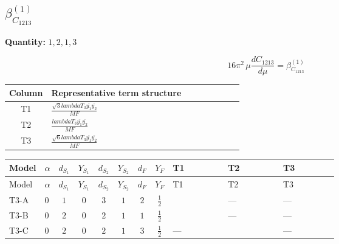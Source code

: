 \documentclass[8pt]{article}
\begin{document}
\begin{landscape}
\section*{$\beta_{C_{1213}}^{(1)}$}
\noindent\textbf{Quantity: }$\mathrm{1,2,1,3}$\par\smallskip
\[16\pi^2\,\mu\frac{d C_{1213}}{d\mu}=\beta_{C_{1213}}^{(1)}\]
\begin{center}
\begin{tabular}{@{}c >{\raggedright\arraybackslash}p{0.82\linewidth}@{}}
\toprule
Column & Representative term structure \\
\midrule
T1 & \(\displaystyle \frac{\sqrt{3} lambdaT_{3} \overline{y_{1}} \overline{y_{2}}}{MF}\) \\
\midrule
T2 & \(\displaystyle \frac{lambdaT_{3} \overline{y_{1}} \overline{y_{2}}}{MF}\) \\
\midrule
T3 & \(\displaystyle \frac{\sqrt{6} lambdaT_{3} \overline{y_{1}} \overline{y_{2}}}{MF}\) \\
\midrule
\bottomrule
\end{tabular}
\end{center}
\smallskip
\tiny
\begin{longtable}{@{}llcccccc >{\raggedright\arraybackslash}p{0.21\linewidth} >{\raggedright\arraybackslash}p{0.21\linewidth} >{\raggedright\arraybackslash}p{0.21\linewidth}@{}}
\toprule
Model & $\alpha$ & $d_{S_1}$ & $Y_{S_1}$ & $d_{S_2}$ & $Y_{S_2}$ & $d_F$ & $Y_F$ & T1 & T2 & T3 \\
\midrule
\endfirsthead
\toprule
Model & $\alpha$ & $d_{S_1}$ & $Y_{S_1}$ & $d_{S_2}$ & $Y_{S_2}$ & $d_F$ & $Y_F$ & T1 & T2 & T3 \\
\midrule
\endhead
T3-A & $0$ & $1$ & $0$ & $3$ & $1$ & $2$ & $\frac{1}{2}$ & \scriptsize\adjustbox{max width=\linewidth}{$\begin{gathered} - \frac{\sqrt{3} lambdaT_{3} \overline{y_{1}} \overline{y_{2}}}{3 MF}\end{gathered}$} & --- & --- \\
\midrule
T3-B & $0$ & $2$ & $0$ & $2$ & $1$ & $1$ & $\frac{1}{2}$ & \scriptsize\adjustbox{max width=\linewidth}{$\begin{gathered} - \frac{\sqrt{3} lambdaT_{3} \overline{y_{1}} \overline{y_{2}}}{3 MF}\end{gathered}$} & --- & --- \\
\midrule
T3-C & $0$ & $2$ & $0$ & $2$ & $1$ & $3$ & $\frac{1}{2}$ & --- & \scriptsize\adjustbox{max width=\linewidth}{$\begin{gathered} \frac{lambdaT_{3} \overline{y_{1}} \overline{y_{2}}}{3 MF}\end{gathered}$} & --- \\

\end{longtable}
\end{landscape}
\end{document}
